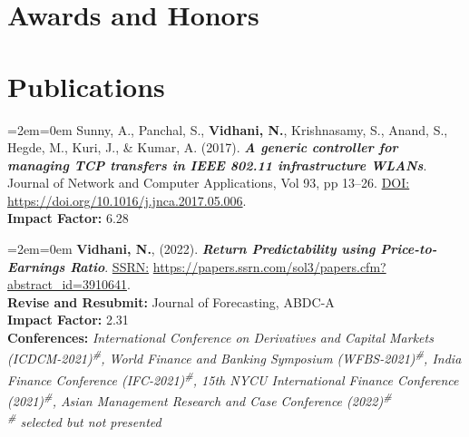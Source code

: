 \documentclass[11pt,a4paper,]{moderncv}
\begin{document}
\hypertarget{awards-and-honors}{%
\section{Awards and Honors}\label{awards-and-honors}}

\nopagebreak

\newpage

\hypertarget{publications}{%
\section{Publications}\label{publications}}

\begingroup
\setlength{\parindent}{-0.5in}
\setlength{\leftskip}{0.5in}

%
  \par%
  \medskip
  \leftskip=2em\rightskip=0em%
  \noindent\ignorespaces
Sunny, A., Panchal, S., \textbf{Vidhani, N.}, Krishnasamy, S., Anand, S., Hegde, M., Kuri, J., \& Kumar, A. (2017). \textbf{\textit{A generic controller for managing TCP transfers in IEEE 802.11 infrastructure WLANs}}. Journal of Network and Computer Applications, Vol 93, pp 13--26. \underline{DOI:} \url{https://doi.org/10.1016/j.jnca.2017.05.006}.\\
\textbf{Impact Factor:} 6.28\\
%
  \par\medskip

%
  \par%
  \medskip
  \leftskip=2em\rightskip=0em%
  \noindent\ignorespaces
\textbf{Vidhani, N.}, (2022). \textbf{\textit{Return Predictability using
Price-to-Earnings Ratio}}. \underline{SSRN:} \url{https://papers.ssrn.com/sol3/papers.cfm?abstract_id=3910641}.\\
\textbf{Revise and Resubmit:} Journal of Forecasting, ABDC-A\\
\textbf{Impact Factor:} 2.31\\
\textbf{Conferences:} \textit{International Conference on Derivatives and Capital Markets (ICDCM-2021)\textsuperscript{\#}, World Finance and Banking Symposium (WFBS-2021)\textsuperscript{\#}, India Finance Conference (IFC-2021)\textsuperscript{\#}, 15th NYCU International Finance Conference (2021)\textsuperscript{\#}, Asian Management Research and Case Conference (2022)\textsuperscript{\#}}\\
\textit{\textsuperscript{\#} selected but not presented}\\
%
  \par\medskip
\end{document}
